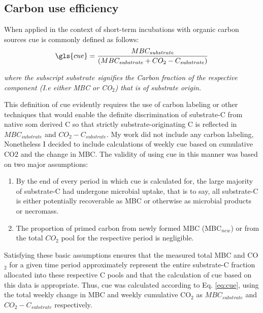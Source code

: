     \subsection{Carbon use efficiency}

		When applied in the context of short-term incubations with organic carbon sources \gls{cue} is commonly defined as follows:\\

		\begin{align}
		\gls{cue} = \frac{MBC_{substrate}}{(MBC_{substrate} + CO_2-C_{substrate})}\label{eq:cue}
		\end{align}

  	 	\begin{adjustwidth}{50pt}{50pt}
  	 		\begin{footnotesize}
  	 			\textit{where the subscript $ substrate $ signifies the Carbon fraction of the respective component (I.e either MBC or CO$ _2 $) that is of substrate origin.
  	 			}\\
  	 		\end{footnotesize}
  	 	\end{adjustwidth}
    	This definition of \gls{cue} evidently requires the use of carbon labeling or other techniques that would enable the definite discrimination of substrate-C from native \gls{som} derived C so that strictly substrate-originating C is reflected in $ MBC_{substrate} $ and $ CO_2-C_{substrate} $.
    	My work did not include any carbon labeling, Nonetheless I decided to include calculations of weekly \gls{cue} based on cumulative CO2 and the change in MBC. The validity of using \gls{cue} in this manner was based on two major assumptions:\\
    	\begin{enumerate}
    		\item By the end of every period in which \gls{cue} is calculated for, the large majority of substrate-C had undergone microbial uptake, that is to say, all substrate-C is either potentially recoverable as MBC or otherwise as microbial products or necromass.
    		\item The proportion of primed carbon from newly formed MBC (MBC$ _{new} $) or from the total $ CO_2 $ pool for the respective period is negligible.
    	\end{enumerate}
    	Satisfying these basic assumptions ensures that the measured total MBC and CO$ _2 $  for a given time period approximately represent the entire substrate-C fraction allocated into these respective C pools and that the calculation of \gls{cue} based on this data is appropriate. Thus, \gls{cue} was calculated according to Eq. \ref{eq:cue}, using the total weekly change in MBC and weekly cumulative CO$ _2 $ as  $MBC_{substrate} $ and $ CO_2-C_{substrate} $ respectively.




